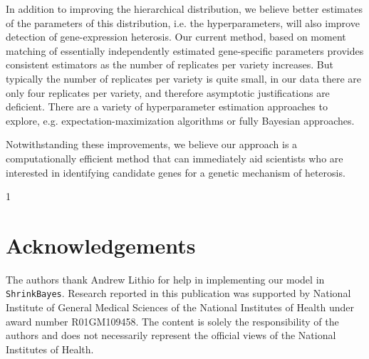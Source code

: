 \documentclass[useAMS,usenatbib,referee]{biom}
\newcommand{\blind}{1} %
\newcommand{\Stan}{Stan}
\newcommand{\ShrinkBayes}{{\tt ShrinkBayes}}
\begin{document}
In addition to improving the hierarchical distribution, we believe better estimates of the parameters of this distribution, i.e. the hyperparameters, will also improve detection of gene-expression heterosis. Our current method, based on moment matching of essentially independently estimated gene-specific parameters provides consistent estimators as the number of replicates per variety increases. But typically the number of replicates per variety is quite small, in our data there are only four replicates per variety, and therefore asymptotic justifications are deficient. There are a variety of hyperparameter estimation approaches to explore, e.g. expectation-maximization algorithms or fully Bayesian approaches.

Notwithstanding these improvements, we believe our approach is a computationally efficient method that can immediately aid scientists who are interested in identifying candidate genes for a genetic mechanism of heterosis. 





\backmatter %

\blind{
\section*{Acknowledgements}

The authors thank Andrew Lithio for help in implementing our model in \ShrinkBayes{}. Research reported in this publication was supported by National Institute of General Medical Sciences of the National Institutes of Health under award number R01GM109458. The content is solely the responsibility of the authors and does not necessarily represent the official views of the National Institutes of Health.
} \fi







\label{lastpage}
\end{document}
